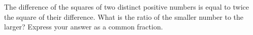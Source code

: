 The difference of the squares of two distinct positive numbers is equal to twice the square of their difference. What is the ratio of the smaller number to the larger? Express your answer as a common fraction.
